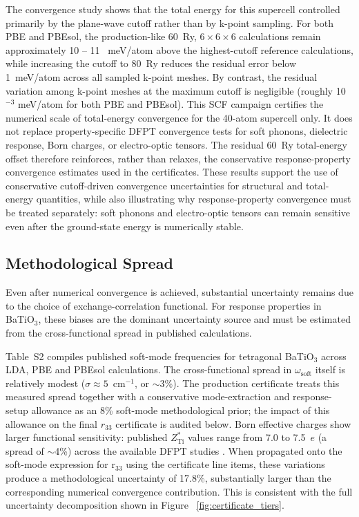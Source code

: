 \documentclass[twocolumn,superscriptaddress,amsmath,amssymb,longbibliography]{revtex4-2}
\begin{document}
The convergence study shows that the total energy for this supercell controlled primarily by the plane-wave cutoff rather than
by k-point sampling. For both PBE and PBEsol, the production-like 60~Ry, $6\times6\times 6$
calculations remain approximately 10 -- 11 ~meV/atom above the highest-cutoff reference calculations, while increasing the cutoff to 80~Ry reduces the residual error below 1~meV/atom across all sampled k-point meshes.
By contrast, the residual variation
among k-point meshes at the maximum cutoff is negligible (roughly 10$^{-3}$ meV/atom for both PBE and PBEsol).
This SCF campaign certifies the numerical scale of total-energy convergence for the 40-atom supercell only. It does not replace property-specific DFPT convergence tests for soft phonons, dielectric response, Born charges, or electro-optic tensors. The residual 60~Ry total-energy offset therefore reinforces, rather than relaxes, the conservative response-property convergence estimates used in the certificates.
These results support the use of conservative cutoff-driven convergence
uncertainties for structural and total-energy quantities, while also illustrating
why response-property convergence must be treated separately: soft phonons and
electro-optic tensors can remain sensitive even after the ground-state energy
is numerically stable.

\subsection{Methodological Spread}

Even after numerical convergence is achieved, substantial uncertainty remains due to the choice of exchange-correlation functional. For response properties in BaTiO$_3$, these biases
are the dominant uncertainty source and must be estimated from the cross-functional spread
in published calculations.

Table~S2 compiles published soft-mode
frequencies for tetragonal BaTiO$_3$ across LDA, PBE and PBEsol calculations.
The cross-functional spread in $\omega_{\mathrm{soft}}$ itself is relatively modest
($\sigma \approx 5$~cm$^{-1}$, or $\sim$3\%). The production certificate treats this measured spread together with a conservative mode-extraction and response-setup allowance as an 8\% soft-mode methodological prior; the impact of this allowance on the final $r_{33}$ certificate is audited below. Born effective charges show
larger functional sensitivity: published $Z^*_{\mathrm{Ti}}$ values range
from 7.0 to 7.5~$e$ (a spread of $\sim$4\%) across the available DFPT studies
 \cite{Ghosez1998_BEC,Zhong1994_BTO,Veithen2005,Dieguez2005}. When propagated onto the soft-mode expression for r$_{33}$ using the certificate line items, these variations produce a methodological uncertainty of 17.8\%, substantially larger than the corresponding numerical convergence contribution. This is consistent with the full uncertainty decomposition shown in
Figure ~\ref{fig:certificate_tiers}.
\end{document}
